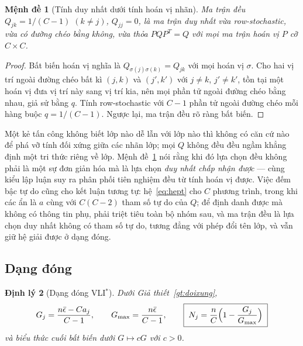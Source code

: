 \documentclass[11pt]{article}
\newtheorem{dinhly}{Định lý}
\newtheorem{menhde}[dinhly]{Mệnh đề}
\theoremstyle{remark}
\begin{document}
\begin{menhde}[Tính duy nhất dưới tính hoán vị nhãn]
\label{md:hoanvi}
Ma trận đều $Q_{jk} = 1/(C-1)$ $(k\ne j)$, $Q_{jj}=0$, là ma trận
\emph{duy nhất} vừa row-stochastic, vừa có đường chéo bằng không, vừa thỏa
$P Q P^T = Q$ với mọi ma trận hoán vị $P$ cỡ $C\times C$.
\end{menhde}

\begin{proof}
Bất biến hoán vị nghĩa là $Q_{\sigma(j)\sigma(k)} = Q_{jk}$ với mọi hoán vị
$\sigma$. Cho hai vị trí ngoài đường chéo bất kì $(j,k)$ và $(j',k')$ với
$j\ne k$, $j'\ne k'$, tồn tại một hoán vị đưa vị trí này sang vị trí kia, nên
mọi phần tử ngoài đường chéo bằng nhau, giả sử bằng $q$. Tính row-stochastic
với $C-1$ phần tử ngoài đường chéo mỗi hàng buộc $q = 1/(C-1)$. Ngược lại, ma
trận đều rõ ràng bất biến.
\end{proof}

Một kẻ tấn công không biết lớp nào dễ lẫn với lớp nào thì không có căn cứ nào
để phá vỡ tính đối xứng giữa các nhãn lớp; mọi $Q$ không đều đều ngầm khẳng
định một tri thức riêng về lớp. Mệnh đề~\ref{md:hoanvi} nói rằng khi đó lựa
chọn đều không phải là một sự đơn giản hóa mà là lựa chọn \emph{duy nhất chấp
nhận được} --- cùng kiểu lập luận suy ra phân phối tiên nghiệm đều từ tính
hoán vị được. Việc đếm bậc tự do cũng cho kết luận tương tự: hệ~\eqref{eq:hept}
cho $C$ phương trình, trong khi các ẩn là $a$ cùng với $C(C-2)$ tham số tự do
của $Q$; để định danh được mà không có thông tin phụ, phải triệt tiêu toàn bộ
nhóm sau, và ma trận đều là lựa chọn duy nhất không có tham số tự do, tương
đẳng với phép đổi tên lớp, và vẫn giữ hệ giải được ở dạng đóng.

\subsection{Dạng đóng}

\begin{dinhly}[Dạng đóng VLI$^*$]
\label{dl:dangdong}
Dưới Giả thiết~\ref{gt:doixung},
\begin{equation}
 G_j = \frac{n\bar\epsilon - C a_j}{C-1},
 \qquad
 G_{\max} = \frac{n\bar\epsilon}{C-1},
 \qquad
 \boxed{\;N_j = \frac{n}{C}\Bigl(1 - \frac{G_j}{G_{\max}}\Bigr)\;}
 \label{eq:dangdong}
\end{equation}
và biểu thức cuối bất biến dưới $G \mapsto cG$ với $c>0$.
\end{dinhly}
\end{document}
